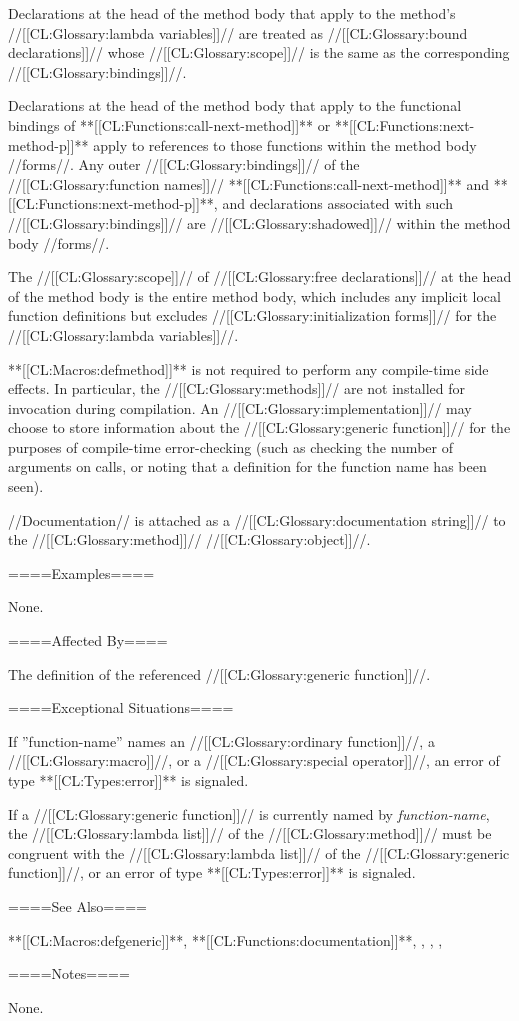 Declarations at the head of the method body that apply to the method's //[[CL:Glossary:lambda variables]]// are treated as //[[CL:Glossary:bound declarations]]// whose //[[CL:Glossary:scope]]// is the same as the corresponding //[[CL:Glossary:bindings]]//.

Declarations at the head of the method body that apply to the functional bindings of **[[CL:Functions:call-next-method]]** or **[[CL:Functions:next-method-p]]** apply to references to those functions within the method body //forms//. Any outer //[[CL:Glossary:bindings]]// of the //[[CL:Glossary:function names]]// **[[CL:Functions:call-next-method]]** and **[[CL:Functions:next-method-p]]**, and declarations associated with such //[[CL:Glossary:bindings]]// are //[[CL:Glossary:shadowed]]// within the method body //forms//.

The //[[CL:Glossary:scope]]// of //[[CL:Glossary:free declarations]]// at the head of the method body is the entire method body, which includes any implicit local function definitions but excludes //[[CL:Glossary:initialization forms]]// for the //[[CL:Glossary:lambda variables]]//.

**[[CL:Macros:defmethod]]** is not required to perform any compile-time side effects. In particular, the //[[CL:Glossary:methods]]// are not installed for invocation during compilation. An //[[CL:Glossary:implementation]]// may choose to store information about the //[[CL:Glossary:generic function]]// for the purposes of compile-time error-checking (such as checking the number of arguments on calls, or noting that a definition for the function name has been seen).

//Documentation// is attached as a //[[CL:Glossary:documentation string]]// to the //[[CL:Glossary:method]]// //[[CL:Glossary:object]]//.

====Examples====

None.

====Affected By====

The definition of the referenced //[[CL:Glossary:generic function]]//.

====Exceptional Situations====

If ''function-name'' names an //[[CL:Glossary:ordinary function]]//, a //[[CL:Glossary:macro]]//, or a //[[CL:Glossary:special operator]]//, an error of type **[[CL:Types:error]]** is signaled.

If a //[[CL:Glossary:generic function]]// is currently named by {\it function-name}, the //[[CL:Glossary:lambda list]]// of the //[[CL:Glossary:method]]// must be congruent with the //[[CL:Glossary:lambda list]]// of the //[[CL:Glossary:generic function]]//, or an error of type **[[CL:Types:error]]** is signaled.


====See Also====

**[[CL:Macros:defgeneric]]**, **[[CL:Functions:documentation]]**, {\secref\IntroToMethods}, {\secref\GFMethodLambdaListCongruency}, {\secref\SpecializerQualifierAgreement}, {\secref\DocVsDecls}

====Notes====

None.


   
